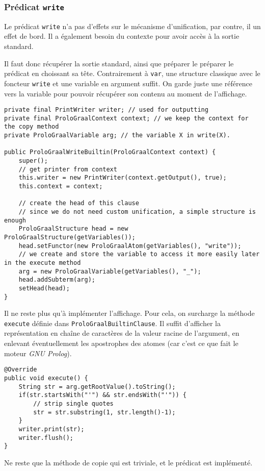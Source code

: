 \documentclass[../report.tex]{subfiles}
\begin{document}
\subsubsection{Prédicat \texttt{write}}
Le prédicat \texttt{write} n'a pas d'effets sur le mécanisme d'unification, par contre, il un effet de bord. Il a également besoin du contexte pour avoir accès à la sortie standard.

Il faut donc récupérer la sortie standard, ainsi que préparer le préparer le prédicat en choissant sa tête. Contrairement à \texttt{var}, une structure classique avec le foncteur \texttt{write} et une variable en argument suffit. On garde juste une référence vers la variable pour pouvoir récupérer son contenu au moment de l'affichage.
\begin{verbatim}
private final PrintWriter writer; // used for outputting
private final ProloGraalContext context; // we keep the context for the copy method
private ProloGraalVariable arg; // the variable X in write(X).

public ProloGraalWriteBuiltin(ProloGraalContext context) {
    super();
    // get printer from context
    this.writer = new PrintWriter(context.getOutput(), true);
    this.context = context;

    // create the head of this clause
    // since we do not need custom unification, a simple structure is enough
    ProloGraalStructure head = new ProloGraalStructure(getVariables());
    head.setFunctor(new ProloGraalAtom(getVariables(), "write"));
    // we create and store the variable to access it more easily later in the execute method
    arg = new ProloGraalVariable(getVariables(), "_");
    head.addSubterm(arg);
    setHead(head);
}
\end{verbatim}
Il ne reste plus qu'à implémenter l'affichage. Pour cela, on surcharge la méthode \texttt{execute} définie dans \texttt{ProloGraalBuiltinClause}. Il suffit d'afficher la représentation en chaîne de caractères de la valeur racine de l'argument, en enlevant éventuellement les apostrophes des atomes (car c'est ce que fait le moteur \textit{GNU Prolog}).
\begin{verbatim}
@Override
public void execute() {
    String str = arg.getRootValue().toString();
    if(str.startsWith("'") && str.endsWith("'")) {
        // strip single quotes
        str = str.substring(1, str.length()-1);
    }
    writer.print(str);
    writer.flush();
}
\end{verbatim}
Ne reste que la méthode de copie qui est triviale, et le prédicat est implémenté.
\end{document}
